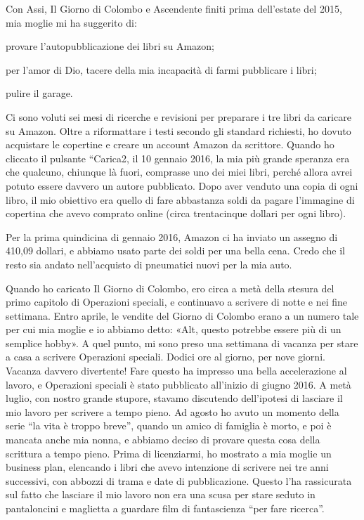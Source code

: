Con Assi, Il Giorno di Colombo e Ascendente finiti prima dell'estate del
2015, mia moglie mi ha suggerito di:

\hfill\break

provare l'autopubblicazione dei libri su Amazon;

per l'amor di Dio, tacere della mia incapacità di farmi pubblicare i
libri;

pulire il garage.

\hfill\break

Ci sono voluti sei mesi di ricerche e revisioni per preparare i tre
libri da caricare su Amazon. Oltre a riformattare i testi secondo gli
standard richiesti, ho dovuto acquistare le copertine e creare un
account Amazon da scrittore. Quando ho cliccato il pulsante ``Carica2,
il 10 gennaio 2016, la mia più grande speranza era che qualcuno,
chiunque là fuori, comprasse uno dei miei libri, perché allora avrei
potuto essere davvero un autore pubblicato. Dopo aver venduto una copia
di ogni libro, il mio obiettivo era quello di fare abbastanza soldi da
pagare l'immagine di copertina che avevo comprato online (circa
trentacinque dollari per ogni libro).

Per la prima quindicina di gennaio 2016, Amazon ci ha inviato un assegno
di 410,09 dollari, e abbiamo usato parte dei soldi per una bella cena.
Credo che il resto sia andato nell'acquisto di pneumatici nuovi per la
mia auto.

Quando ho caricato Il Giorno di Colombo, ero circa a metà della stesura
del primo capitolo di Operazioni speciali, e continuavo a scrivere di
notte e nei fine settimana. Entro aprile, le vendite del Giorno di
Colombo erano a un numero tale per cui mia moglie e io abbiamo detto:
«Alt, questo potrebbe essere più di un semplice hobby». A quel punto, mi
sono preso una settimana di vacanza per stare a casa a scrivere
Operazioni speciali. Dodici ore al giorno, per nove giorni. Vacanza
davvero divertente! Fare questo ha impresso una bella accelerazione al
lavoro, e Operazioni speciali è stato pubblicato all'inizio di giugno
2016. A metà luglio, con nostro grande stupore, stavamo discutendo
dell'ipotesi di lasciare il mio lavoro per scrivere a tempo pieno. Ad
agosto ho avuto un momento della serie ``la vita è troppo breve'',
quando un amico di famiglia è morto, e poi è mancata anche mia nonna, e
abbiamo deciso di provare questa cosa della scrittura a tempo pieno.
Prima di licenziarmi, ho mostrato a mia moglie un business plan,
elencando i libri che avevo intenzione di scrivere nei tre anni
successivi, con abbozzi di trama e date di pubblicazione. Questo l'ha
rassicurata sul fatto che lasciare il mio lavoro non era una scusa per
stare seduto in pantaloncini e maglietta a guardare film di fantascienza
``per fare ricerca''.

